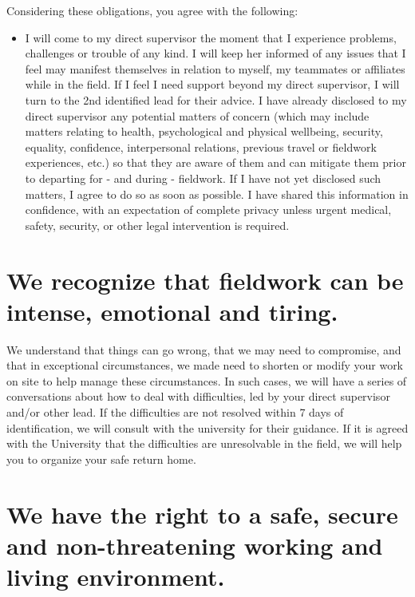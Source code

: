 \documentclass[
]{book}
\providecommand{\tightlist}{%
  \setlength{\itemsep}{0pt}\setlength{\parskip}{0pt}}
\begin{document}
Considering these obligations, you agree with the following:

\begin{itemize}
\tightlist
\item
  I will come to my direct supervisor the moment that I experience problems, challenges or trouble of any kind. I will keep her informed of any issues that I feel may manifest themselves in relation to myself, my teammates or affiliates while in the field. If I feel I need support beyond my direct supervisor, I will turn to the 2nd identified lead for their advice. I have already disclosed to my direct supervisor any potential matters of concern (which may include matters relating to health, psychological and physical wellbeing, security, equality, confidence, interpersonal relations, previous travel or fieldwork experiences, etc.) so that they are aware of them and can mitigate them prior to departing for - and during - fieldwork. If I have not yet disclosed such matters, I agree to do so as soon as possible. I have shared this information in confidence, with an expectation of complete privacy unless urgent medical, safety, security, or other legal intervention is required.
\end{itemize}

\hypertarget{we-recognize-that-fieldwork-can-be-intense-emotional-and-tiring.}{%
\section{We recognize that fieldwork can be intense, emotional and tiring.}\label{we-recognize-that-fieldwork-can-be-intense-emotional-and-tiring.}}

We understand that things can go wrong, that we may need to compromise, and that in exceptional circumstances, we made need to shorten or modify your work on site to help manage these circumstances. In such cases, we will have a series of conversations about how to deal with difficulties, led by your direct supervisor and/or other lead. If the difficulties are not resolved within 7 days of identification, we will consult with the university for their guidance. If it is agreed with the University that the difficulties are unresolvable in the field, we will help you to organize your safe return home.

\hypertarget{we-have-the-right-to-a-safe-secure-and-non-threatening-working-and-living-environment.}{%
\section{We have the right to a safe, secure and non-threatening working and living environment.}\label{we-have-the-right-to-a-safe-secure-and-non-threatening-working-and-living-environment.}}
\end{document}
